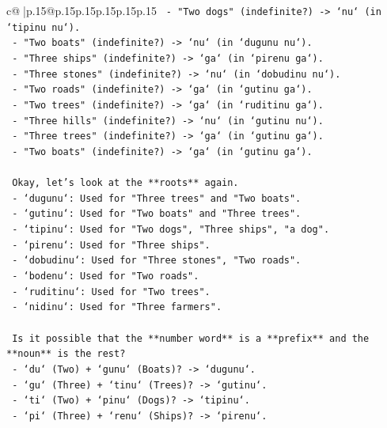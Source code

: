 \documentclass{article}
\begin{document}
{\begin{supertabular}{c@{$\;$}|p{.15\linewidth}@{}p{.15\linewidth}p{.15\linewidth}p{.15\linewidth}p{.15\linewidth}p{.15\linewidth}}
{{{\texttt{     {-} "Two dogs" (indefinite?) {-}> `nu` (in `tipinu nu`).} \\
\texttt{     {-} "Two boats" (indefinite?) {-}> `nu` (in `dugunu nu`).} \\
\texttt{     {-} "Three ships" (indefinite?) {-}> `ga` (in `pirenu ga`).} \\
\texttt{     {-} "Three stones" (indefinite?) {-}> `nu` (in `dobudinu nu`).} \\
\texttt{     {-} "Two roads" (indefinite?) {-}> `ga` (in `gutinu ga`).} \\
\texttt{     {-} "Two trees" (indefinite?) {-}> `ga` (in `ruditinu ga`).} \\
\texttt{     {-} "Three hills" (indefinite?) {-}> `nu` (in `gutinu nu`).} \\
\texttt{     {-} "Three trees" (indefinite?) {-}> `ga` (in `gutinu ga`).} \\
\texttt{     {-} "Two boats" (indefinite?) {-}> `ga` (in `gutinu ga`).} \\
\\ 
\texttt{   Okay, let's look at the **roots** again.} \\
\texttt{   {-} `dugunu`: Used for "Three trees" and "Two boats".} \\
\texttt{   {-} `gutinu`: Used for "Two boats" and "Three trees".} \\
\texttt{   {-} `tipinu`: Used for "Two dogs", "Three ships", "a dog".} \\
\texttt{   {-} `pirenu`: Used for "Three ships".} \\
\texttt{   {-} `dobudinu`: Used for "Three stones", "Two roads".} \\
\texttt{   {-} `bodenu`: Used for "Two roads".} \\
\texttt{   {-} `ruditinu`: Used for "Two trees".} \\
\texttt{   {-} `nidinu`: Used for "Three farmers".} \\
\\ 
\texttt{   Is it possible that the **number word** is a **prefix** and the **noun** is the rest?} \\
\texttt{   {-} `du` (Two) + `gunu` (Boats)? {-}> `dugunu`.} \\
\texttt{   {-} `gu` (Three) + `tinu` (Trees)? {-}> `gutinu`.} \\
\texttt{   {-} `ti` (Two) + `pinu` (Dogs)? {-}> `tipinu`.} \\
\texttt{   {-} `pi` (Three) + `renu` (Ships)? {-}> `pirenu`.} \\
}}}
\end{supertabular}}
\end{document}

